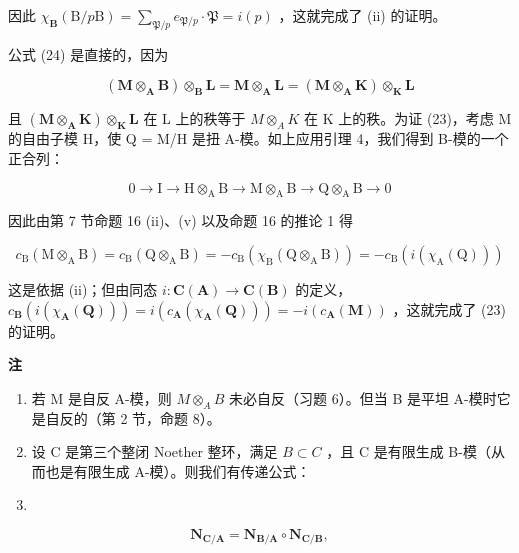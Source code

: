 因此 \(\chi_{\mathbf{B}}(\mathrm{B} / p\mathrm{B}) = \sum_{\mathfrak{P} / p}e_{\mathfrak{P} / p}\cdot \mathfrak{P} = i(p)\) ，这就完成了 (ii) 的证明。

公式 (24) 是直接的，因为

\[
(\mathbf {M} \otimes_ {\mathbf {A}} \mathbf {B}) \otimes_ {\mathbf {B}} \mathbf {L} = \mathbf {M} \otimes_ {\mathbf {A}} \mathbf {L} = (\mathbf {M} \otimes_ {\mathbf {A}} \mathbf {K}) \otimes_ {\mathbf {K}} \mathbf {L}
\]

且 \((\mathbf{M} \otimes_{\mathbf{A}} \mathbf{K}) \otimes_{\mathbf{K}} \mathbf{L}\) 在 L 上的秩等于 \(M \otimes_{A} K\) 在 K 上的秩。为证 (23)，考虑 M 的自由子模 H，使 Q = M/H 是扭 A-模。如上应用引理 4，我们得到 B-模的一个正合列：

\[
0 \rightarrow \mathrm{I} \rightarrow \mathrm{H} \otimes_ {\mathrm{A}} \mathrm{B} \rightarrow \mathrm{M} \otimes_ {\mathrm{A}} \mathrm{B} \rightarrow \mathrm{Q} \otimes_ {\mathrm{A}} \mathrm{B} \rightarrow 0
\]

因此由第 7 节命题 16 (ii)、(v) 以及命题 16 的推论 1 得

\[
c _ {\mathrm{B}} (\mathrm{M} \otimes_ {\mathrm{A}} \mathrm{B}) = c _ {\mathrm{B}} (\mathrm{Q} \otimes_ {\mathrm{A}} \mathrm{B}) = - c _ {\mathrm{B}} \left(\chi_ {\mathrm{B}} (\mathrm{Q} \otimes_ {\mathrm{A}} \mathrm{B})\right) = - c _ {\mathrm{B}} (i \left(\chi_ {\mathrm{A}} (\mathrm{Q})\right))
\]

这是依据 (ii)；但由同态 \(i: \mathbf{C}(\mathbf{A}) \to \mathbf{C}(\mathbf{B})\) 的定义，\(c_{\mathbf{B}}(i(\chi_{\mathbf{A}}(\mathbf{Q}))) = i(c_{\mathbf{A}}(\chi_{\mathbf{A}}(\mathbf{Q}))) = -i(c_{\mathbf{A}}(\mathbf{M}))\) ，这就完成了 (23) 的证明。

\textbf{注}\par

\begin{enumerate}
\def\labelenumi{(\arabic{enumi})}
\item
  若 M 是自反 A-模，则 \(M \otimes_{A} B\) 未必自反（习题 6）。但当 B 是平坦 A-模时它是自反的（第 2 节，命题 8）。
\item
  设 C 是第三个整闭 Noether 整环，满足 \(B \subset C\) ，且 C 是有限生成 B-模（从而也是有限生成 A-模）。则我们有传递公式：
\item
\end{enumerate}

\[
\mathbf {N} _ {\mathbf {C} / \mathbf {A}} = \mathbf {N} _ {\mathbf {B} / \mathbf {A}} \circ \mathbf {N} _ {\mathbf {C} / \mathbf {B}},\tag{26}
\]


